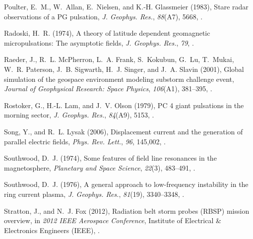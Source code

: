 \documentclass[draft,linenumbers]{agujournal}
\begin{document}
\begin{thebibliography}{62}
Poulter, E.~M., W.~Allan, E.~Nielsen, and K.-H. Glassmeier (1983), Stare radar
  observations of a {PG} pulsation, \textit{J. Geophys. Res.}, \textit{88}(A7),
  5668, .

Radoski, H.~R. (1974), A theory of latitude dependent geomagnetic
  micropulsations: The asymptotic fields, \textit{J. Geophys. Res.},
  \textit{79}, .

Raeder, J., R.~L. McPherron, L.~A. Frank, S.~Kokubun, G.~Lu, T.~Mukai, W.~R.
  Paterson, J.~B. Sigwarth, H.~J. Singer, and J.~A. Slavin (2001), Global
  simulation of the geospace environment modeling substorm challenge event,
  \textit{Journal of Geophysical Research: Space Physics}, \textit{106}(A1),
  381--395, .

Rostoker, G., H.-L. Lam, and J.~V. Olson (1979), {PC 4} giant pulsations in the
  morning sector, \textit{J. Geophys. Res.}, \textit{84}(A9), 5153,
  .

Song, Y., and R.~L. Lysak (2006), Displacement current and the generation of
  parallel electric fields, \textit{Phys. Rev. Lett.}, \textit{96}, 145,002,
  .

Southwood, D.~J. (1974), Some features of field line resonances in the
  magnetosphere, \textit{Planetary and Space Science}, \textit{22}(3),
  483--491, .

Southwood, D.~J. (1976), A general approach to low-frequency instability in the
  ring current plasma, \textit{J. Geophys. Res.}, \textit{81}(19), 3340--3348,
  .

Stratton, J., and N.~J. Fox (2012), Radiation belt storm probes ({RBSP})
  mission overview, in \textit{2012 {IEEE} Aerospace Conference}, Institute of
  Electrical {\&} Electronics Engineers ({IEEE}),
  .


\end{thebibliography}
\end{document}
